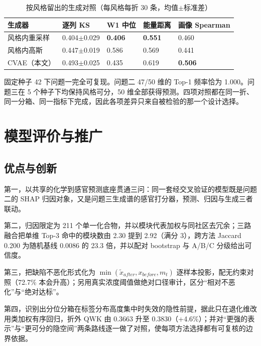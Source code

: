 \documentclass[zihao=-4,a4paper,UTF8,fontset=none]{ctexart}
\begin{document}
\begin{table}[H]
\begin{threeparttable}
\centering
\small
\caption{按风格留出的生成对照（每风格每折 30 条，均值$\pm$标准差）}
\begin{tabularx}{\textwidth}{@{}LYYYY@{}}
\toprule
\textbf{生成器} & \textbf{逐列 KS} & \textbf{W1 中位} & \textbf{能量距离} & \textbf{画像 Spearman} \\ \midrule
风格内重采样 & 0.404$\pm$0.029 & \textbf{0.406} & \textbf{0.551} & 0.460 \\
风格内高斯 & 0.447$\pm$0.019 & 0.586 & 0.569 & 0.441 \\
CVAE（本文） & 0.493$\pm$0.025 & 0.435 & 0.619 & \textbf{0.506} \\
\bottomrule
\end{tabularx}
\end{threeparttable}
\end{table}

固定种子 42 下问题一完全可复现。问题二 47/50 维的 Top-1 频率恰为 1.000。问题三在 5 个种子下均保持风格可分，50 维全部获得预测。四项对照都在同一折、同一分箱、同一指标下完成，因此各项差异只来自被检验的那一个设计选择。

\section{模型评价与推广}

\subsection{优点与创新}

第一，以共享的化学到感官预测底座贯通三问：同一套经交叉验证的模型既是问题二的 SHAP 归因对象，又是问题三生成谱的感官打分器，预测、归因与生成三者联动。

第二，归因限定为 211 个单一化合物，并以模块代表加权与同社区去冗余；三路融合把单维 Top-3 命中的模块数由 2.30 提到 2.92（满分 3），跨方法 Jaccard 0.200 为随机基线 0.0086 的 23.3 倍，并以配对 bootstrap 与 A/B/C 分级给出可信度。

第三，把缺陷不恶化形式化为 $\min(\tilde x_{after},x_{before},m_t)$ 逐样本投影，配无约束对照（72.7\% 本会升高）；另用真实浓度阈值做绝对口径审计，区分“相对不恶化”与“绝对达标”。

第四，识别出分位分箱在标签分布高度集中时失效的隐性前提，据此只在退化维改用类加权有序回归，折外 QWK 由 0.3663 升至 0.3830（+4.6\%）；并对“更强的表示”与“更可分的隐空间”两条路线逐一做了对照，使每项方法选择都有可复核的边界依据。
\end{document}
